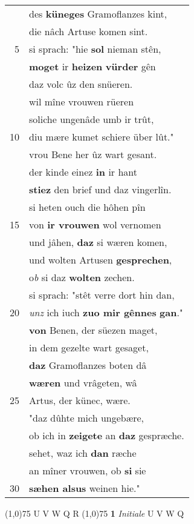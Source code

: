 \documentclass[8pt,a4paper,notitlepage]{article}
\begin{document}
\begin{table}[ht]
\begin{minipage}[t]{0.5\linewidth}
\begin{tabular}{rl}
 & des \textbf{küneges} Gramoflanzes kint,\\ 
 & die nâch Artuse komen sint.\\ 
5 & si sprach: "hie \textbf{sol} nieman stên,\\ 
 & \textbf{moget} ir \textbf{heizen} \textbf{vürder} gên\\ 
 & daz volc ûz den snüeren.\\ 
 & wil mîne vrouwen rüeren\\ 
 & soliche ungenâde umb ir trût,\\ 
10 & diu mære kumet schiere über lût."\\ 
 & vrou Bene her ûz wart gesant.\\ 
 & der kinde einez \textbf{in} ir hant\\ 
 & \textbf{stiez} den brief und daz vingerlîn.\\ 
 & si heten ouch die hôhen pîn\\ 
15 & von \textbf{ir vrouwen} wol vernomen\\ 
 & und jâhen, \textbf{daz} si wæren komen,\\ 
 & und wolten Artusen \textbf{gesprechen},\\ 
 & o\textit{b} si daz \textbf{wolte}\textbf{n} zechen.\\ 
 & si sprach: "stêt verre dort hin dan,\\ 
20 & \textit{unz} ich iuch \textbf{zuo mir gênnes} \textbf{gan}."\\ 
 & \textbf{von} Benen, der süezen maget,\\ 
 & in dem gezelte wart gesaget,\\ 
 & \textbf{daz} Gramoflanzes boten dâ\\ 
 & \textbf{wæren} und vrâgeten, wâ\\ 
25 & Artus, der künec, wære.\\ 
 & "daz dûhte mich ungebære,\\ 
 & ob ich in \textbf{zeigete} an \textbf{daz} gespræche.\\ 
 & sehet, waz ich \textbf{dan} ræche\\ 
 & an mîner vrouwen, ob \textbf{si} sie\\ 
30 & \textbf{sæhen alsus} weinen hie."\\ 
\end{tabular}
\scriptsize
\line(1,0){75} \newline
U V W Q R \newline
\line(1,0){75} \newline
\textbf{1} \textit{Initiale} U V W Q  \newline

\end{minipage}
\end{table}
\end{document}
